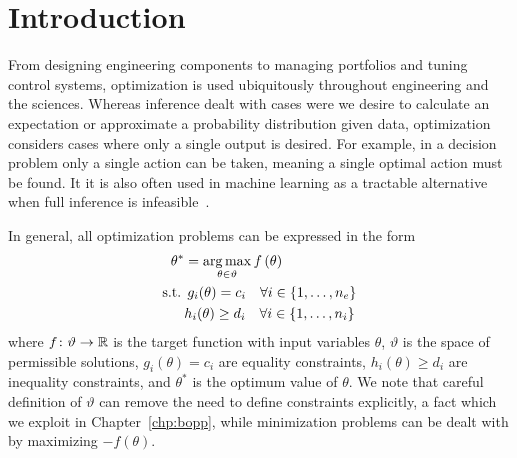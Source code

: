 
\section{Introduction}
\label{sec:opt:intro}

From designing engineering components to managing portfolios and tuning control systems,
optimization is used ubiquitously throughout engineering and the sciences.   Whereas inference
dealt with cases were we desire to calculate an expectation or approximate a probability distribution
given data, optimization considers cases where only a single output is desired.  For example, in
a decision problem only a single action can be taken, meaning a single optimal action must be
found.  It it is also often used in machine learning as a tractable alternative when full inference
is infeasible~\cite{murphy2012machine}.

In general, all optimization problems can be expressed in the form
\begin{align}
	\begin{split}
	\label{eq:opt:funcMax}
	\theta^* &= \operatorname*{arg\,max}_{\theta \in \vartheta} f\left(\theta\right) \\
	\text{s.t.} \: & \: g_i(\theta) = c_i \quad \forall i \in \{1,\dots,n_e\} \\
		 & h_i(\theta) \ge d_i \quad \forall i \in \{1,\dots,n_i\}
	\end{split}
\end{align}
where $f \colon \vartheta \rightarrow \mathbb{R}$ is the target function with input
variables $\theta$, $\vartheta$ is the space of permissible solutions, 
$g_i(\theta) = c_i$ are equality constraints, $h_i(\theta) \ge d_i$ are
inequality constraints, and $\theta^*$ is the optimum value of $\theta$.
We note that careful definition of $\vartheta$ can remove the need to
define constraints explicitly, a fact which we exploit in Chapter~\ref{chp:bopp},
while minimization problems can be dealt with by maximizing $-f\left(\theta\right)$.


